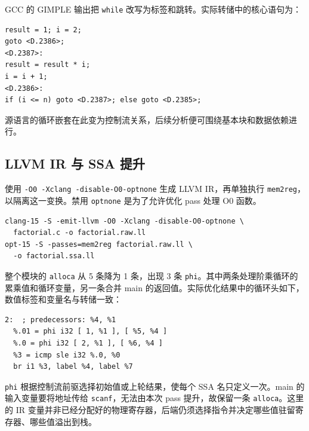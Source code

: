 \documentclass[UTF8,a4paper,10pt,fontset=fandol]{ctexart}
\begin{document}
GCC 的 GIMPLE 输出把 \texttt{while} 改写为标签和跳转。实际转储中的核心语句为：
\par\noindent\begin{minipage}{\linewidth}
\begin{lstlisting}[numbers=none]
result = 1; i = 2;
goto <D.2386>;
<D.2387>:
result = result * i;
i = i + 1;
<D.2386>:
if (i <= n) goto <D.2387>; else goto <D.2385>;
\end{lstlisting}
\end{minipage}\par
源语言的循环嵌套在此变为控制流关系，后续分析便可围绕基本块和数据依赖进行。

\subsection{LLVM IR 与 SSA 提升}
使用 \texttt{-O0 -Xclang -disable-O0-optnone} 生成 LLVM IR，再单独执行 \texttt{mem2reg}，以隔离这一变换。禁用 \texttt{optnone} 是为了允许优化 pass 处理 O0 函数\cite{llvm}。
\par\noindent\begin{minipage}{\linewidth}
\begin{lstlisting}[numbers=none]
clang-15 -S -emit-llvm -O0 -Xclang -disable-O0-optnone \
  factorial.c -o factorial.raw.ll
opt-15 -S -passes=mem2reg factorial.raw.ll \
  -o factorial.ssa.ll
\end{lstlisting}
\end{minipage}\par
整个模块的 \texttt{alloca} 从 5 条降为 1 条，出现 3 条 \texttt{phi}。其中两条处理阶乘循环的累乘值和循环变量，另一条合并 main 的返回值。实际优化结果中的循环头如下，数值标签和变量名与转储一致：
\par\noindent\begin{minipage}{\linewidth}
\begin{lstlisting}[numbers=none]
2:  ; predecessors: %4, %1
  %.01 = phi i32 [ 1, %1 ], [ %5, %4 ]
  %.0 = phi i32 [ 2, %1 ], [ %6, %4 ]
  %3 = icmp sle i32 %.0, %0
  br i1 %3, label %4, label %7
\end{lstlisting}
\end{minipage}\par
\texttt{phi} 根据控制流前驱选择初始值或上轮结果，使每个 SSA 名只定义一次。main 的输入变量要将地址传给 \texttt{scanf}，无法由本次 pass 提升，故保留一条 \texttt{alloca}。这里的 IR 变量并非已经分配好的物理寄存器，后端仍须选择指令并决定哪些值驻留寄存器、哪些值溢出到栈。
\end{document}
